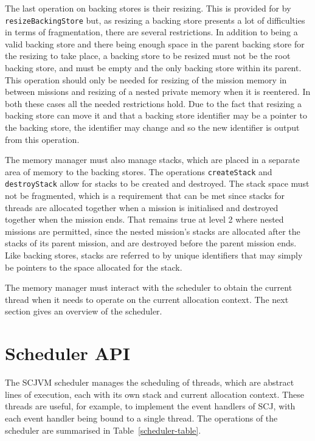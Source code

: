 The last operation on backing stores is their resizing.
This is provided for by \texttt{resize\-Backing\-Store} but, as
resizing a backing store presents a lot of difficulties in terms of
fragmentation, there are several restrictions.
In addition to being a valid backing store and there being enough
space in the parent backing store for the resizing to take place, a
backing store to be resized must not be the root backing store, and
must be empty and the only backing store within its parent.
This operation should only be needed for resizing of the mission
memory in between missions and resizing of a nested private memory
when it is reentered.
In both these cases all the needed restrictions hold.
Due to the fact that resizing a backing store can move it and that a
backing store identifier may be a pointer to the backing store, the
identifier may change and so the new identifier is output from this
operation.

The memory manager must also manage stacks, which are placed in a
separate area of memory to the backing stores.
The operations \texttt{create\-Stack} and \texttt{destroy\-Stack}
allow for stacks to be created and destroyed.
The stack space must not be fragmented, which is a requirement that
can be met since stacks for threads are allocated together when a
mission is initialised and destroyed together when the mission ends.
That remains true at level 2 where nested missions are permitted,
since the nested mission's stacks are allocated after the stacks of
its parent mission, and are destroyed before the parent mission ends.
Like backing stores, stacks are referred to by unique identifiers that
may simply be pointers to the space allocated for the stack.

The memory manager must interact with the scheduler to obtain the
current thread when it needs to operate on the current allocation
context.
The next section gives an overview of the scheduler.

\section{Scheduler API}
\label{scheduler-section}

The SCJVM scheduler manages the scheduling of threads, which are
abstract lines of execution, each with its own stack and current
allocation context.
These threads are useful, for example, to implement the event handlers
of SCJ, with each event handler being bound to a single thread.
The operations of the scheduler are summarised in
Table~\ref{scheduler-table}.

